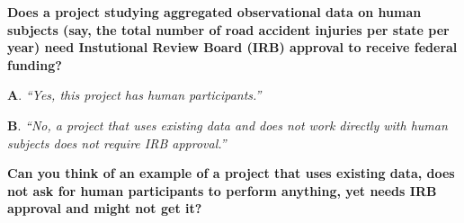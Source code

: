 \documentclass[portrait,11pt]{seminar}
\begin{document}
\bs 
{\bf
Does a project studying aggregated observational data on human subjects (say, the total number of road accident injuries per state per year) need Instutional Review Board (IRB) approval to receive federal funding?
}

\medskip 

{\bf A}. {\it  ``Yes, this project has human participants.''}

\medskip 

{\bf B}. {\it ``No, a project that uses existing data and does not work directly with human subjects does not require IRB approval.''}



\es
\bs




{\bf 
Can you think of an example of a project that uses existing data, does not ask for human participants to perform anything, yet needs IRB approval and might not get it?
}






\end{document}
